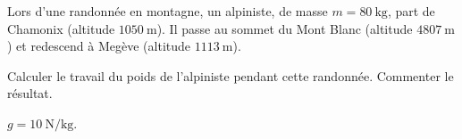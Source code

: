 Lors d'une randonnée en montagne, un alpiniste, de masse $m=\qty{80}{\kg}$, part
de Chamonix (altitude $\qty{1050}{\m}$). Il passe au sommet du Mont Blanc
(altitude $\qty{4807}{\m}$) et redescend à Megève (altitude $\qty{1113}{\m}$).

Calculer le travail du poids de l'alpiniste pendant cette randonnée. Commenter
le résultat.

\begin{donnees}
	$g=\qty{10}{\N\per\kg}$.
\end{donnees}
